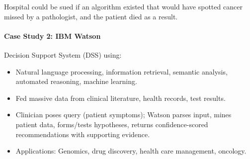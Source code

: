 \begin{tipbox}
Hospital could be sued if an algorithm existed that would have spotted cancer missed by a pathologist, and the patient died as a result.
\end{tipbox}

\separator

\paragraph*{Case Study 2: IBM Watson}

\begin{defbox}
Decision Support System (DSS) using:
\begin{itemize}
  \item Natural language processing, information retrieval, semantic analysis, automated reasoning, machine learning.
  \item Fed massive data from clinical literature, health records, test results.
  \item Clinician poses query (patient symptoms); Watson parses input, mines patient data, forms/tests hypotheses, returns confidence-scored recommendations with supporting evidence.
  \item Applications: Genomics, drug discovery, health care management, oncology.
\end{itemize}
\end{defbox}

